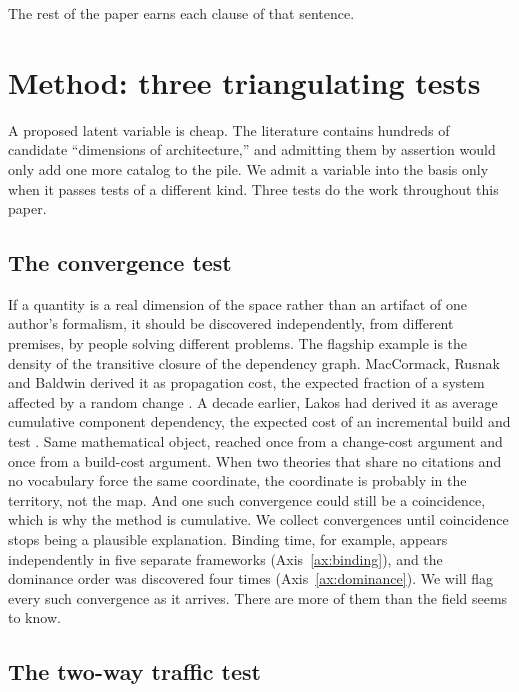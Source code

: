 \documentclass[11pt,oneside]{article}
\theoremstyle{definition}
\begin{document}
The rest of the paper earns each clause of that sentence.

\section{Method: three triangulating tests}

A proposed latent variable is cheap. The literature contains hundreds of candidate ``dimensions
of architecture,'' and admitting them by assertion would only add one more catalog to the pile.
We admit a variable into the basis only when it passes tests of a different kind. Three tests do
the work throughout this paper.

\subsection{The convergence test}

If a quantity is a real dimension of the space rather than an artifact of one author's
formalism, it should be discovered independently, from different premises, by people solving
different problems. The flagship example is the density of the transitive closure of the
dependency graph. MacCormack, Rusnak and Baldwin derived it as propagation cost, the expected
fraction of a system affected by a random change \cite{maccormack2006}. A decade earlier, Lakos
had derived it as average cumulative component dependency, the expected cost of an incremental
build and test \cite{lakos1996}. Same mathematical object, reached once from a change-cost
argument and once from a build-cost argument. When two theories that share no citations and no
vocabulary force the same coordinate, the coordinate is probably in the territory, not the map.
And one such convergence could still be a coincidence, which is why the method is cumulative.
We collect convergences until coincidence stops being a plausible explanation. Binding time,
for example, appears independently in five separate frameworks (Axis~\ref{ax:binding}), and
the dominance order was discovered four times (Axis~\ref{ax:dominance}). We will flag every
such convergence as it arrives. There are more of them than the field seems to know.

\subsection{The two-way traffic test}
\end{document}
